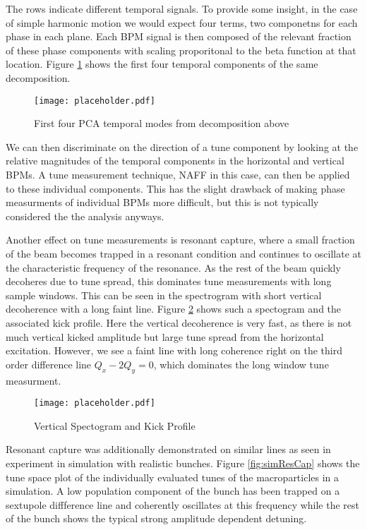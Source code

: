 The rows indicate different temporal signals. To provide some insight, in the case of simple harmonic motion we would expect four terms, two componetns for each phase in each plane. Each BPM signal is then composed of the relevant fraction of these phase components with scaling proporitonal to the beta function at that location. Figure \ref{fig:pcaTemps} shows the first four temporal components of the same decomposition. 

\begin{figure}
	\centering
	\texttt{[image: placeholder.pdf]}
	\caption{First four PCA temporal modes from decomposition above}
	\label{fig:pcaTemps}
\end{figure}

We can then discriminate on the direction of a tune component by looking at the relative magnitudes of the temporal components in the horizontal and vertical BPMs. A tune measurement technique, NAFF in this case, can then be applied to these individual components. This has the slight drawback of making phase measurments of individual BPMs more difficult, but this is not typically considered the the analysis anyways. 

Another effect on tune measurements is resonant capture, where a small fraction of the beam becomes trapped in a resonant condition and continues to oscillate at the characteristic frequency of the resonance. As the rest of the beam quickly decoheres due to tune spread, this dominates tune measurements with long sample windows. This can be seen in the spectrogram with short vertical decoherence with a long faint line. Figure \ref{fig:specResCap} shows such a spectogram and the associated kick profile. Here the vertical decoherence is very fast, as there is not much vertical kicked amplitude but large tune spread from the horizontal excitation. However, we see a faint line with long coherence right on the third order difference line $Q_x-2Q_y = 0$, which dominates the long window tune measurment.

\begin{figure}
	\centering
	\texttt{[image: placeholder.pdf]}
	\caption{Vertical Spectogram and Kick Profile}
	\label{fig:specResCap}
\end{figure}

Resonant capture was additionally demonstrated on similar lines as seen in experiment in simulation with realistic bunches. Figure \ref{fig:simResCap} shows the tune space plot of the individually evaluated tunes of the macroparticles in a simulation. A low population component of the bunch has been trapped on a sextupole diffference line and coherently oscillates at this frequency while the rest of the bunch shows the typical strong amplitude dependent detuning. 

